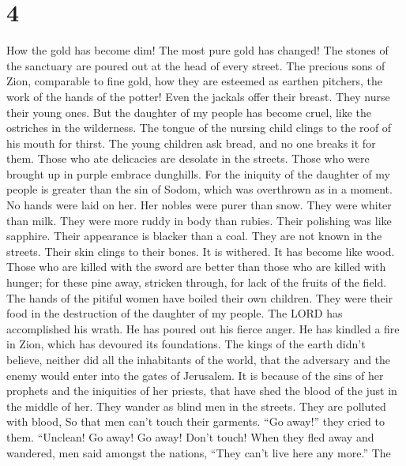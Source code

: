 \hypertarget{section-3}{%
\section{4}\label{section-3}}

 How the gold has become dim! The most pure gold has
changed! The stones of the sanctuary are poured out at the head of every
street.  The precious sons of Zion, comparable to fine
gold, how they are esteemed as earthen pitchers, the work of the hands
of the potter!  Even the jackals offer their breast. They
nurse their young ones. But the daughter of my people has become cruel,
like the ostriches in the wilderness.  The tongue of the
nursing child clings to the roof of his mouth for thirst. The young
children ask bread, and no one breaks it for them.  Those
who ate delicacies are desolate in the streets. Those who were brought
up in purple embrace dunghills.  For the iniquity of the
daughter of my people is greater than the sin of Sodom, which was
overthrown as in a moment. No hands were laid on her.  Her
nobles were purer than snow. They were whiter than milk. They were more
ruddy in body than rubies. Their polishing was like sapphire.
 Their appearance is blacker than a coal. They are not
known in the streets. Their skin clings to their bones. It is withered.
It has become like wood.  Those who are killed with the
sword are better than those who are killed with hunger; for these pine
away, stricken through, for lack of the fruits of the field.
 The hands of the pitiful women have boiled their own
children. They were their food in the destruction of the daughter of my
people.  The LORD has accomplished his wrath. He has
poured out his fierce anger. He has kindled a fire in Zion, which has
devoured its foundations.  The kings of the earth didn't
believe, neither did all the inhabitants of the world, that the
adversary and the enemy would enter into the gates of Jerusalem.
 It is because of the sins of her prophets and the
iniquities of her priests, that have shed the blood of the just in the
middle of her.  They wander as blind men in the streets.
They are polluted with blood, So that men can't touch their garments.
 ``Go away!'' they cried to them. ``Unclean! Go away! Go
away! Don't touch! When they fled away and wandered, men said amongst
the nations, ``They can't live here any more.''  The
